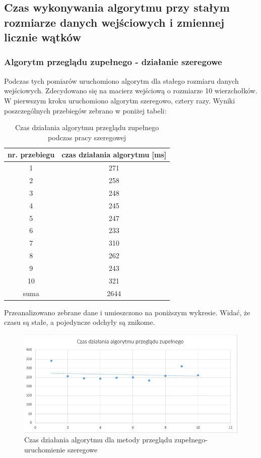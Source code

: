 \documentclass{article}
\begin{document}
	\subsection{Czas wykonywania algorytmu przy stałym rozmiarze danych wejściowych i zmiennej licznie wątków}	
		
		\subsubsection{Algorytm przeglądu zupełnego - działanie szeregowe}
	
			Podczas tych pomiarów uruchomiono algorytm dla stałego rozmiaru danych wejściowych. Zdecydowano się na macierz wejściową o rozmiarze 10 wierzchołków. \\
			W pierwszym kroku uruchomiono algorytm szeregowo, cztery razy. Wyniki poszczególnych przebiegów zebrano w poniżej tabeli:
			\begin{table}[H]
				\centering
				\caption{Czas działania algorytmu przeglądu zupełnego podczas pracy szeregowej}
				\begin{tabular}{|c|c|}
					
					\hline nr. przebiegu  & czas działania algorytmu [ms] \\ 
					\hline  1 & 271 \\ 
					\hline  2 & 258 \\ 
					\hline  3 & 248 \\ 
					\hline  4 & 245 \\ 
					\hline  5 & 247 \\ 
					\hline  6 & 233 \\ 
					\hline  7 & 310 \\ 
					\hline  8 & 262 \\ 
					\hline  9 & 243 \\ 
					\hline  10 & 321 \\ 
					\hline  suma & 2644 \\ 
					\hline 
				\end{tabular} 
			\end{table}
			
			Przeanalizowano zebrane dane i umieszczono na poniższym wykresie. Widać, że czasu są stałe, a pojedyncze odchyły są znikome.
			
				\begin{figure}[H]
					\centering
					\includegraphics[width=0.9\linewidth]{BFS2}
					\caption{Czas działania algorytmu dla metody przeglądu zupełnego-uruchomienie szeregowe}
				\end{figure}
\end{document}

